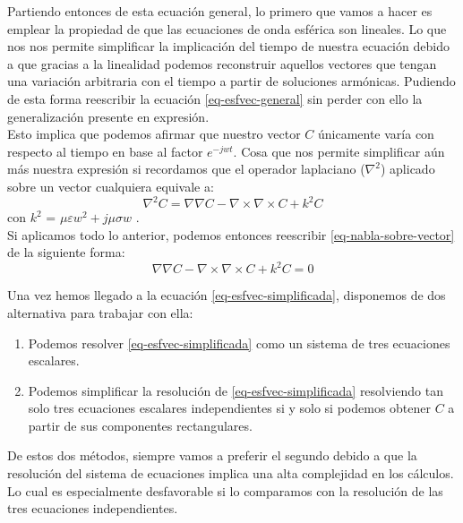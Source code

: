 \documentclass{article}
\begin{document}
Partiendo entonces de esta ecuación general, lo primero que vamos a hacer es emplear la propiedad de que las ecuaciones de onda esférica son lineales. Lo que nos nos permite simplificar la implicación del tiempo de nuestra ecuación debido a que gracias a la linealidad podemos reconstruir aquellos vectores que tengan una variación arbitraria con el tiempo a partir de soluciones armónicas. Pudiendo de esta forma reescribir la ecuación \eqref{eq-esfvec-general} sin perder con ello la generalización presente en expresión. \\

Esto implica que podemos afirmar que nuestro vector $C$ únicamente varía con respecto al tiempo en base al factor $e^{-jwt}$. Cosa que nos permite simplificar aún más nuestra expresión si recordamos que el operador laplaciano ($\nabla^2$) aplicado sobre un vector cualquiera equivale a:
\begin{equation}
\nabla^2C =\nabla\nabla C - \nabla\times\nabla\times C + k^2C
\label{eq-nabla-sobre-vector}
\end{equation}
con $k^2$ = $\mu\varepsilon w^2 + j\mu\sigma w$ .\\

Si aplicamos todo lo anterior, podemos entonces reescribir  \eqref{eq-nabla-sobre-vector} de la siguiente forma:
\begin{equation}
\nabla\nabla C - \nabla \times \nabla \times C + k^2 C = 0
\label{eq-esfvec-simplificada}
\end{equation}

\newpage

Una vez hemos llegado a la ecuación \eqref{eq-esfvec-simplificada}, disponemos de dos alternativa para trabajar con ella: 

\begin{enumerate}
    \item Podemos resolver \eqref{eq-esfvec-simplificada} como un sistema de tres ecuaciones escalares.
    \item Podemos simplificar la resolución de \eqref{eq-esfvec-simplificada} resolviendo tan solo tres ecuaciones escalares independientes si y solo si podemos obtener $C$ a partir de sus componentes rectangulares.
\end{enumerate}

De estos dos métodos, siempre vamos a preferir el segundo debido a que la resolución del sistema de ecuaciones implica una alta complejidad en los cálculos. Lo cual es especialmente desfavorable si lo comparamos con la resolución de las tres ecuaciones independientes.
\\
\end{document}
